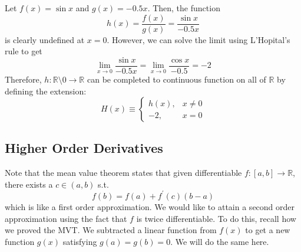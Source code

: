   \begin{example}
    Let $f(x) = \sin{x}$ and $g(x) = -0.5x$. Then, the function 
    \begin{equation}
      h(x) = \frac{f(x)}{g(x)} = \frac{\sin{x}}{-0.5x}
    \end{equation}
    is clearly undefined at $x = 0$. 
    However, we can solve the limit using L'Hopital's rule to get
    \begin{equation}
      \lim_{x \rightarrow 0} \frac{\sin{x}}{-0.5x} = \lim_{x \rightarrow 0} \frac{\cos{x}}{-0.5} = -2
    \end{equation}
    Therefore, $h: \mathbb{R} \setminus 0 \longrightarrow \mathbb{R}$ can be completed to continuous function on all of $\mathbb{R}$ by defining the extension: 
    \begin{equation}
      H(x) \equiv \begin{cases} h(x), & x \neq 0 \\ -2, & x = 0 \end{cases} 
    \end{equation}
  \end{example}

\subsection{Higher Order Derivatives} 

  Note that the mean value theorem states that given differentiable $f: [a, b] \to \mathbb{R}$, there exists a $c \in (a, b)$ s.t. 
  \begin{equation}
    f (b) = f (a) + f^\prime (c) (b - a) 
  \end{equation}
  which is like a first order approximation. We would like to attain a second order approximation using the fact that $f$ is twice differentiable. To do this, recall how we proved the MVT. We subtracted a linear function from $f(x)$ to get a new function $g(x)$ satisfying $g(a) = g(b) = 0$. We will do the same here.

